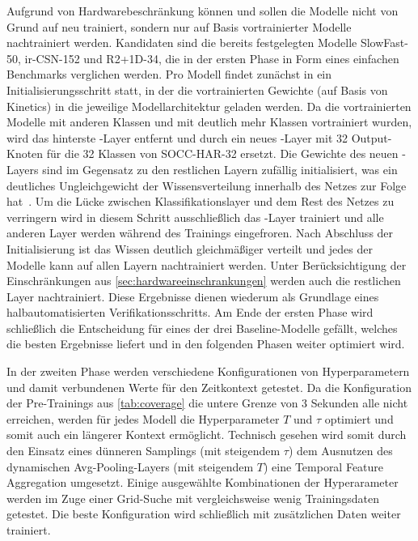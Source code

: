 Aufgrund von Hardwarebeschränkung können und sollen die Modelle nicht von Grund auf neu trainiert, sondern nur auf Basis vortrainierter Modelle nachtrainiert werden.
Kandidaten sind die bereits festgelegten Modelle SlowFast-50, ir-CSN-152 und R2+1D-34, die in der ersten Phase in Form eines einfachen Benchmarks verglichen werden.
Pro Modell findet zunächst in ein Initialisierungsschritt statt, in der die vortrainierten Gewichte (auf Basis von Kinetics) in die jeweilige Modellarchitektur geladen werden.
Da die vortrainierten Modelle mit anderen Klassen und mit deutlich mehr Klassen vortrainiert wurden, wird das hinterste \fc-Layer entfernt und durch ein neues \fc-Layer mit 32 Output-Knoten für die 32 Klassen von SOCC-HAR-32 ersetzt.
Die Gewichte des neuen \fc-Layers sind im Gegensatz zu den restlichen Layern zufällig initialisiert, was ein deutliches Ungleichgewicht der Wissensverteilung innerhalb des Netzes zur Folge hat~\cite{Gugger20}.
Um die Lücke zwischen Klassifikationslayer und dem Rest des Netzes zu verringern wird in diesem Schritt ausschließlich das \fc-Layer trainiert und alle anderen Layer werden während des Trainings eingefroren.
Nach Abschluss der Initialisierung ist das Wissen deutlich gleichmäßiger verteilt und jedes der Modelle kann auf allen Layern nachtrainiert werden.
Unter Berücksichtigung der Einschränkungen aus \autoref{sec:hardwareeinschrankungen} werden auch die restlichen Layer nachtrainiert.
Diese Ergebnisse dienen wiederum als Grundlage eines halbautomatisierten Verifikationsschritts.
Am Ende der ersten Phase wird schließlich die Entscheidung für eines der drei Baseline-Modelle gefällt, welches die besten Ergebnisse liefert und in den folgenden Phasen weiter optimiert wird.

In der zweiten Phase werden verschiedene Konfigurationen von Hyperparametern und damit verbundenen Werte für den Zeitkontext getestet.
Da die Konfiguration der Pre-Trainings aus \autoref{tab:coverage} die untere Grenze von 3 Sekunden alle nicht erreichen, werden für jedes Modell die Hyperparameter $T$ und $\tau$ optimiert und somit auch ein längerer Kontext ermöglicht.
Technisch gesehen wird somit durch den Einsatz eines dünneren Samplings (mit steigendem $\tau$) \bzw dem Ausnutzen des dynamischen Avg-Pooling-Layers (mit steigendem $T$) eine Temporal Feature Aggregation umgesetzt.
Einige ausgewählte Kombinationen der Hyperarameter werden im Zuge einer Grid-Suche mit vergleichsweise wenig Trainingsdaten getestet.
Die beste Konfiguration wird schließlich mit zusätzlichen Daten weiter trainiert.

